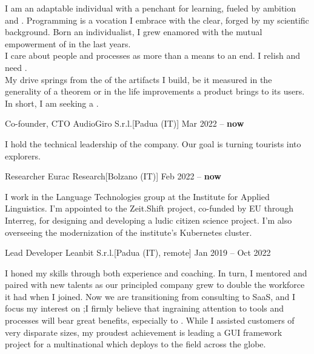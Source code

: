 \documentclass[
  fontsize=9pt,
  DIV=calc,
  parskip=half,
]{scrartcl}
\def\Phi{1.618}
\newlength{\Pad}\setlength{\Pad}{14.562pt} %
\begin{document}

I am an adaptable individual with a penchant for learning, fueled by ambition
and .
Programming is a vocation I embrace with the clear, 
forged by my scientific background.
Born an individualist, I grew enamored with the mutual empowerment of
 in the last years.\\[\smallskipamount]
I care about people and processes as more than a means to an end.
I relish and need .\\
My drive springs from the  of the artifacts I build, be
it measured in the generality of a theorem or in the life improvements a
product brings to its users. In short, I am seeking a .


\Event
  {Co-founder, CTO}
  {AudioGiro S.r.l.}[Padua (IT)]
  {Mar 2022 -- \textbf{now}}

I hold the technical leadership of the company.
Our goal is turning tourists into explorers.

\Event
  {Researcher}
  {Eurac Research}[Bolzano (IT)]
  {Feb 2022 -- \textbf{now}}

I work in the Language Technologies group at the Institute for Applied Linguistics.
I'm appointed to the Zeit.Shift project, co-funded by EU through Interreg, for designing and developing a ludic citizen science project.
I'm also overseeing the modernization of the institute's Kubernetes cluster.

\Event
  {Lead Developer}
  {Leanbit S.r.l.}[Padua (IT), remote]
  {Jan 2019 -- Oct 2022}

I honed my  skills through both experience and coaching. In
turn, I mentored and paired with new talents as our  principled company
grew to double the workforce it had when I joined.
%
Now we are transitioning from consulting to SaaS, and I focus my interest on
;\linebreak I firmly believe that ingraining attention to tools
and processes will bear great benefits, especially to .
%
While I assisted customers of very disparate sizes, my proudest achievement is
leading a GUI framework project for a multinational which deploys to the field
across the globe.

\smallskip
\end{document}

